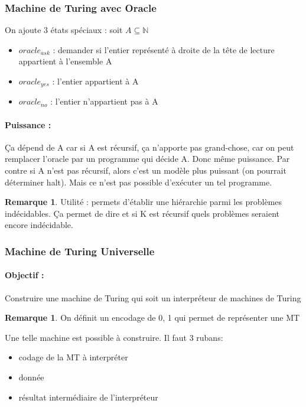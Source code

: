 \documentclass[11pt,a4paper]{article}
\newcommand{\N}{\mathbb{N}}
\theoremstyle{definition}
\newtheorem{myrem}[mydef]{Remarque}
\begin{document}
\subsubsection{Machine de Turing avec Oracle}
On ajoute 3 états spéciaux : soit $A \subseteq \N$
\begin{itemize}
	\item $oracle_{ask}$ : demander si l'entier représenté à droite de la 
		tête de lecture appartient à l'ensemble A
	\item $oracle_{yes}$ : l'entier appartient à A
	\item $oracle_{no}$ :  l'entier n'appartient pas à A
\end{itemize}

\paragraph{Puissance :} Ça dépend de A car si A est récursif, ça n'apporte pas 
grand-chose, car on peut remplacer l'oracle par un programme qui décide A. Donc 
même puissance. Par contre si A n'est pas récursif, alors c'est un modèle plus 
puissant (on pourrait déterminer halt). Mais ce n’est pas possible d'exécuter un tel programme. 

\begin{myrem}
	Utilité : permets d'établir une hiérarchie parmi les problèmes 
	indécidables. Ça permet de dire et si K est récursif quels problèmes 
	seraient encore indécidable.
\end{myrem}

\subsubsection{Machine de Turing Universelle}

\paragraph{Objectif :} Construire une machine de Turing qui soit un 
interpréteur de machines de Turing

\begin{myrem}
	On définit un encodage de 0, 1 qui permet de représenter une MT
\end{myrem}

Une telle machine est possible à construire. Il faut 3 rubans:
\begin{itemize}
	\item codage de la MT à interpréter
	\item donnée
	\item résultat intermédiaire de l'interpréteur
\end{itemize}
\end{document}
